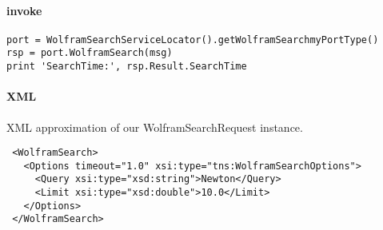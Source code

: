 \paragraph{invoke}
\begin{verbatim}
port = WolframSearchServiceLocator().getWolframSearchmyPortType()
rsp = port.WolframSearch(msg)
print 'SearchTime:', rsp.Result.SearchTime
\end{verbatim}
\par

\paragraph{XML}
XML approximation of our WolframSearchRequest instance.
\begin{verbatim}
 <WolframSearch>
   <Options timeout="1.0" xsi:type="tns:WolframSearchOptions">
     <Query xsi:type="xsd:string">Newton</Query>
     <Limit xsi:type="xsd:double">10.0</Limit>
   </Options>
 </WolframSearch>
\end{verbatim}
\par






